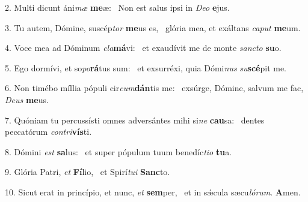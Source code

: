 2. Multi dicunt áni\textit{mæ} \textbf{me}æ: \ast\  Non est salus ipsi in \textit{De}\textit{o} \textbf{e}jus.\

3. Tu autem, Dómine, suscép\textit{tor} \textbf{me}us es, \ast\  glória mea, et exáltans \textit{ca}\textit{put} \textbf{me}um.\

4. Voce mea ad Dóminum \textit{cla}\textbf{má}vi: \ast\  et exaudívit me de monte \textit{sanc}\textit{to} \textbf{su}o.\

5. Ego dormívi, et so\textit{po}\textbf{rá}tus sum: \ast\  et exsurréxi, quia Dómi\textit{nus} \textit{su}\textbf{scé}pit me.\

6. Non timébo míllia pópuli cir\textit{cum}\textbf{dán}tis me: \ast\  exsúrge, Dómine, salvum me fac, \textit{De}\textit{us} \textbf{me}us.\

7. Quóniam tu percussísti omnes adversántes mihi si\textit{ne} \textbf{cau}sa: \ast\  dentes peccatórum \textit{con}\textit{tri}\textbf{vís}ti.\

8. Dómini \textit{est} \textbf{sa}lus: \ast\  et super pópulum tuum benedíc\textit{ti}\textit{o} \textbf{tu}a.\

9. Glória Patri, \textit{et} \textbf{Fí}lio, \ast\  et Spirí\textit{tu}\textit{i} \textbf{Sanc}to.\

10. Sicut erat in princípio, et nunc, \textit{et} \textbf{sem}per, \ast\  et in sǽcula sæcu\textit{ló}\textit{rum}. \textbf{A}men.\

